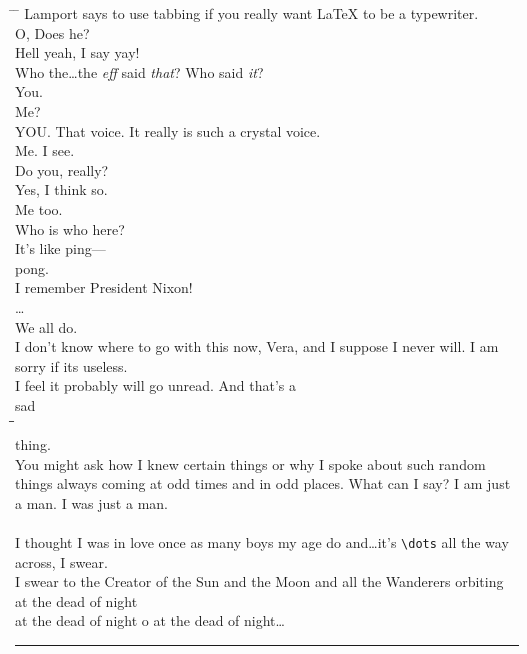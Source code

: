 \documentclass[10pt|draft]{report}
\begin{document}
\begin{tabbing}
\hspace*{1in}\=\hspace*{1in} \= \kill
\> Lamport says to use tabbing if you really want \LaTeX{} to be a typewriter. \\ \> O, Does he? \\ \> \> Hell yeah, I say yay! \\ Who the\dots the \textit{eff} said \textit{that}? Who said \textit{it}? \\ \> You. \\ \>  \> Me? \\ YOU\@. That voice. It really is such a crystal voice. \\ \> Me. I see. \\
Do you, really? \\
\> Yes, I think so. \\ \> \> Me too. \\ Who is who here? \\ \> It's like ping---\\
\> \> pong. \\
I remember President Nixon! \\
\> \> \dots \\
\> We all do. \\
I don't know where to go with this now, Vera, and I suppose I never will. I am sorry if its useless. \\
I feel it probably will go unread. And that's a \\
\> \> sad \\
\=\hspace{1cm}\=\hspace{10mm}\=\hspace{1in}\\
\> \> \> thing.\\


You might ask how I knew certain things or why I spoke about such random things always coming at odd times and in odd places. What can I say? I am just a man. I was just a man.
\kill\\
\=\\
I thought I was in love once as many boys my age do and\dots it's \verb|\dots| all the way across, I swear. \\ \> I swear to the Creator of the Sun and the Moon and all the Wanderers orbiting at the dead of night \\ \> at the dead of night o at the dead of night\dots

\end{tabbing}
\hrule
\end{document}
